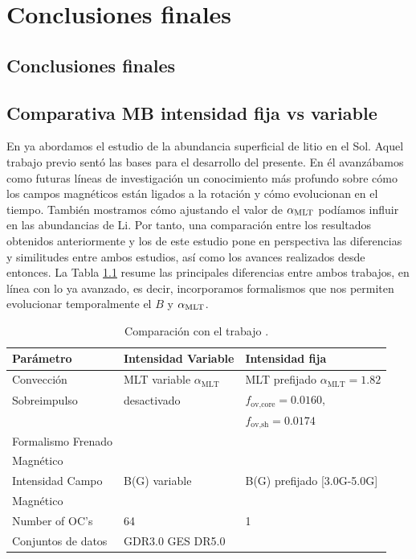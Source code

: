 
\chapter{Conclusiones finales}\label{ch:septimo-capitulo}

\section{Conclusiones finales}
\section{Comparativa MB intensidad fija vs variable}
En \cite{Caballero2020} ya abordamos el estudio de la abundancia superficial de litio en el Sol. Aquel trabajo previo sentó las bases para el desarrollo del presente. En él avanzábamos como futuras líneas de investigación un conocimiento más profundo sobre cómo los campos magnéticos están ligados a la rotación y cómo evolucionan en el tiempo. También mostramos cómo ajustando el valor de $\alpha_{\mathrm{MLT}}$ podíamos influir en las abundancias de Li. Por tanto, una comparación entre los resultados obtenidos anteriormente y los de este estudio pone en perspectiva las diferencias y similitudes entre ambos estudios, así como los avances realizados desde entonces. La Tabla \ref{tab:caballero2023_2020} resume las principales diferencias entre ambos trabajos, en línea con lo ya avanzado, es decir, incorporamos formalismos que nos permiten evolucionar temporalmente el $B$ y $\alpha_{\mathrm{MLT}}$.\par 

\begin{table}
	\centering
	\begin{threeparttable}
		\begin{tabular}{lll} 
			\hline
			Parámetro & Intensidad Variable & Intensidad fija\\
			\hline
			Convección & MLT variable $\alpha_{\textrm{MLT}}$ & MLT prefijado $\alpha_{\textrm{MLT}}=1.82$\\
			Sobreimpulso & desactivado & $f_{\textrm{ov,core}}=0.0160$,\\ & & $f_{\textrm{ov,sh}}=0.0174$\\
			Formalismo Frenado & \cite{Gallet2013} & \cite{Ud-Doula2008} \\ Magnético & & \\
			Intensidad Campo & B(G) variable & B(G) prefijado [3.0G-5.0G]\\ Magnético & & \\
			Number of OC's & 64 & 1 \\
			Conjuntos de datos & GDR3.0 GES DR5.0 & \cite{Sestito2005} \\
			\hline
		\end{tabular}
	\end{threeparttable}
	\caption{Comparación con el trabajo \cite{Caballero2020}.} \label{tab:caballero2023_2020}
\end{table}

